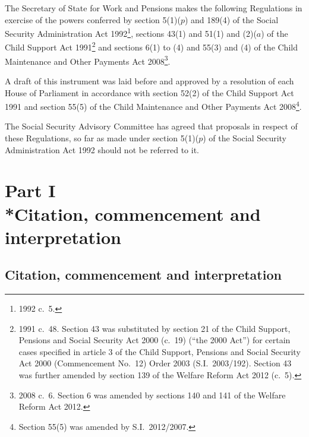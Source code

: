 \documentclass[12pt,a4paper]{article}
\title{\regstitle}
\author{S.I.\ 2014 No.\ 612}
\date{Made
12th March 2014\\
Coming into force
in accordance with regulation 1(3), (4) and (5)
}
\begin{document}
\maketitle

\enlargethispage{\baselineskip}

\noindent
The Secretary of State for Work and Pensions makes the following Regulations in exercise of the powers conferred by section 5(1)($p$)  and 189(4) of the Social Security Administration Act 1992\footnote{1992 c.~5.}, sections 43(1) and 51(1) and (2)($a$)  of the Child Support Act 1991\footnote{1991 c.~48. Section 43 was substituted by section 21 of the Child Support, Pensions and Social Security Act 2000 (c.~19) (“the 2000 Act”) for certain cases specified in article 3 of the Child Support, Pensions and Social Security Act 2000 (Commencement No.~12) Order 2003 (S.I.~2003/192). Section 43 was further amended by section 139 of the Welfare Reform Act 2012 (c.~5).} and sections 6(1) to (4) and 55(3) and (4) of the Child Maintenance and Other Payments Act 2008\footnote{2008 c.~6. Section 6 was amended by sections 140 and 141 of the Welfare Reform Act 2012.}.

A draft of this instrument was laid before and approved by a resolution of each House of Parliament in accordance with section 52(2) of the Child Support Act 1991 and section 55(5) of the Child Maintenance and Other Payments Act 2008\footnote{Section 55(5) was amended by S.I.~2012/2007.}.

The Social Security Advisory Committee has agreed that proposals in respect of these Regulations, so far as made under section 5(1)($p$)  of the Social Security Administration Act 1992 should not be referred to it. 

{\sloppy

\tableofcontents

}

\bigskip

\setcounter{secnumdepth}{-2}

\section[Part I --- Citation, commencement and interpretation]{Part I\\*Citation, commencement and interpretation}

\renewcommand\parthead{--- Part I}

\subsection[1. Citation, commencement and interpretation]{Citation, commencement and interpretation}
\end{document}
